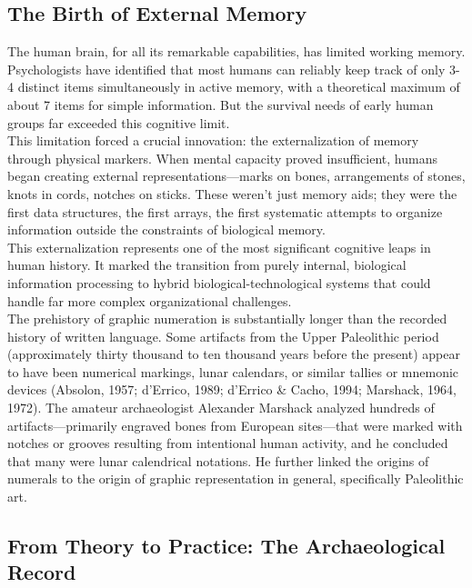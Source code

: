 \subsection{The Birth of External Memory}

The human brain, for all its remarkable capabilities, has limited working memory. Psychologists have identified that most humans can reliably keep track of only 3-4 distinct items simultaneously in active memory, with a theoretical maximum of about 7 items for simple information. But the survival needs of early human groups far exceeded this cognitive limit.\\
This limitation forced a crucial innovation: the externalization of memory through physical markers. When mental capacity proved insufficient, humans began creating external representations—marks on bones, arrangements of stones, knots in cords, notches on sticks. These weren't just memory aids; they were the first data structures, the first arrays, the first systematic attempts to organize information outside the constraints of biological memory.\\
This externalization represents one of the most significant cognitive leaps in human history. It marked the transition from purely internal, biological information processing to hybrid biological-technological systems that could handle far more complex organizational challenges.\\
The prehistory of graphic numeration is substantially longer than the recorded history of written language. Some artifacts from the Upper Paleolithic period (approximately thirty thousand to ten thousand years before the present) appear to have been numerical markings, lunar calendars, or similar tallies or mnemonic devices (Absolon, 1957; d'Errico, 1989; d'Errico \& Cacho, 1994; Marshack, 1964, 1972). The amateur archaeologist Alexander Marshack analyzed hundreds of artifacts—primarily engraved bones from European sites—that were marked with notches or grooves resulting from intentional human activity, and he concluded that many were lunar calendrical notations. He further linked the origins of numerals to the origin of graphic representation in general, specifically Paleolithic art.

\subsection{From Theory to Practice: The Archaeological Record}

